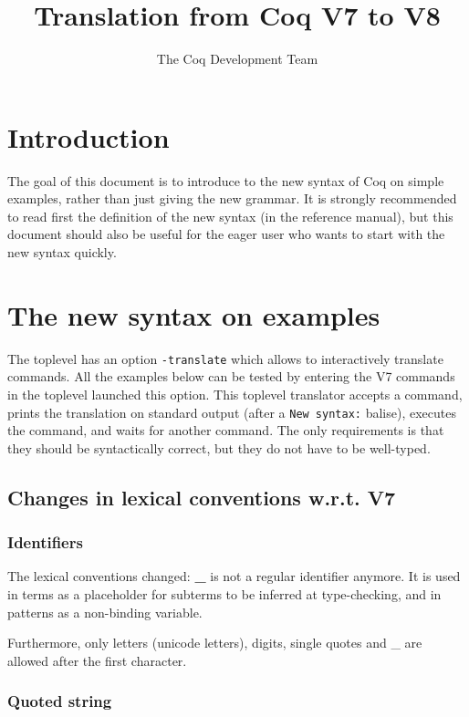 \documentclass[11pt,a4paper]{article}
\title{Translation from Coq V7 to V8}
\author{The Coq Development Team}
\def\TERM#1{\textsf{\bf #1}}
\begin{document}
\maketitle

\section{Introduction}

The goal of this document is to introduce to the new syntax of Coq on
simple examples, rather than just giving the new grammar. It is
strongly recommended to read first the definition of the new syntax
(in the reference manual), but this document should also be useful for
the eager user who wants to start with the new syntax quickly.

\section{The new syntax on examples}

The toplevel has an option {\tt -translate} which allows to
interactively translate commands. All the examples below can be tested
by entering the V7 commands in the toplevel launched this option. This
toplevel translator accepts a command, prints the translation on
standard output (after a \verb+New syntax:+ balise), executes the
command, and waits for another command. The only requirements is that
they should be syntactically correct, but they do not have to be
well-typed.


\subsection{Changes in lexical conventions w.r.t. V7}

\subsubsection{Identifiers}

The lexical conventions changed: \TERM{_} is not a regular identifier
anymore. It is used in terms as a placeholder for subterms to be inferred
at type-checking, and in patterns as a non-binding variable.

Furthermore, only letters (unicode letters), digits, single quotes and
_ are allowed after the first character.

\subsubsection{Quoted string}
\end{document}

